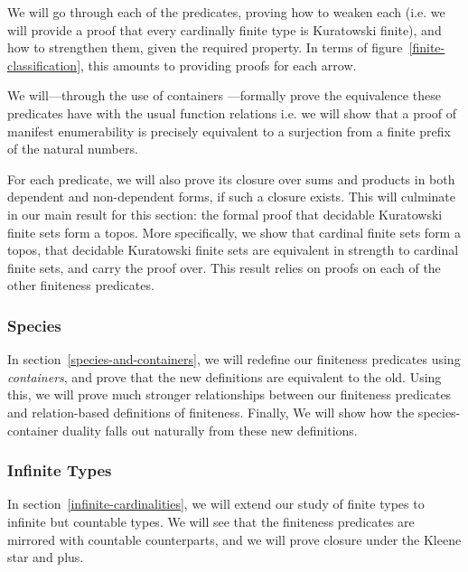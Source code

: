 We will go through each of the predicates, proving how to weaken each (i.e. we
will provide a proof that every cardinally finite type is Kuratowski finite),
and how to strengthen them, given the required property.
In terms of figure~\ref{finite-classification}, this amounts to providing proofs
for each arrow.

We will---through the use of containers
\cite{abbottContainersConstructingStrictly2005}---formally prove the equivalence
these predicates have with the usual function relations i.e. we will show that a
proof of manifest enumerability is precisely equivalent to a surjection from a
finite prefix of the natural numbers.

For each predicate, we will also prove its closure over sums and products in
both dependent and non-dependent forms, if such a closure exists.
This will culminate in our main result for this section: the formal proof that
decidable Kuratowski finite sets form a topos. 
More specifically, we show that cardinal finite sets form a topos, that
decidable Kuratowski finite sets are equivalent in strength to cardinal finite
sets, and carry the proof over.
This result relies on proofs on each of the other finiteness predicates.
\subsubsection{Species}
In section~\ref{species-and-containers}, we will redefine our finiteness
predicates using \emph{containers}, and prove that the new definitions are
equivalent to the old.
Using this, we will prove much stronger relationships between our finiteness
predicates and relation-based definitions of finiteness.
Finally, We will show how the species-container duality falls out naturally from
these new definitions.

\subsubsection{Infinite Types}
In section~\ref{infinite-cardinalities}, we will extend our study of finite
types to infinite but countable types.
We will see that the finiteness predicates are mirrored with countable
counterparts, and we will prove closure under the Kleene star and plus.

